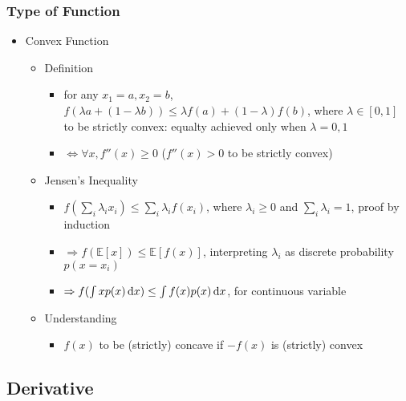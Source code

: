 \subsubsection{Type of Function}
\begin{itemize}
\item Convex Function
	\begin{itemize}
	\item Definition
		\begin{itemize}
		\item for any $x_1=a, x_2=b$, $f(\lambda a + (1-\lambda b)) \le \lambda f(a) + (1-\lambda)f(b)$, where $\lambda \in [0,1]$ \\
		to be strictly convex: equalty achieved only when $\lambda = 0,1$
		\item $\Leftrightarrow \forall x, f''(x) \ge 0$ ($f''(x)>0$ to be strictly convex)
		\end{itemize}
	\item Jensen’s Inequality \label{Math_Calc_Jensen}
		\begin{itemize}
		\item $f(\sum_i \lambda_i x_i ) \le \sum_i \lambda_i f(x_i)$, where $\lambda_i\ge0$ and $\sum_i \lambda_i=1$, proof by induction
		\item $\Rightarrow f(\mathbb E[x]) \le \mathbb E[f(x)]$, interpreting $\lambda_i$ as discrete probability $p(x=x_i)$
		\item $\Rightarrow f(\int xp(x) \mathop{}\!\mathrm{d} x) \le \int f(x)p(x)\mathop{}\!\mathrm{d} x$, for continuous variable
		\end{itemize}
	\item Understanding
		\begin{itemize}
		\item $f(x)$ to be (strictly) concave if $-f(x)$ is (strictly) convex
		\end{itemize}
	\end{itemize}
\end{itemize}

\subsection{Derivative}
